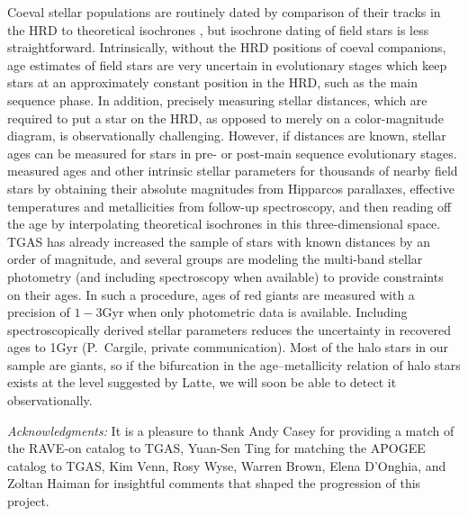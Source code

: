\documentclass[apj, twocolappendix, numberedappendix, appendixfloats]{emulateapj}
\begin{document}
Coeval stellar populations are routinely dated by comparison of their tracks in the HRD to theoretical isochrones \citep[e.g.,][]{sandage1970, chaboyer1998, dotter2007}, but isochrone dating of field stars is less straightforward.
Intrinsically, without the HRD positions of coeval companions, age estimates of field stars are very uncertain in evolutionary stages which keep stars at an approximately constant position in the HRD, such as the main sequence phase.
In addition, precisely measuring stellar distances, which are required to put a star on the HRD, as opposed to merely on a color-magnitude diagram, is observationally challenging.
However, if distances are known, stellar ages can be measured for stars in pre- or post-main sequence evolutionary stages.
\citet{gcs} measured ages and other intrinsic stellar parameters for thousands of nearby field stars by obtaining their absolute magnitudes from Hipparcos parallaxes, effective temperatures and metallicities from follow-up spectroscopy, and then reading off the age by interpolating theoretical isochrones in this three-dimensional space.
TGAS has already increased the sample of stars with known distances by an order of magnitude, and several groups are modeling the multi-band stellar photometry (and including spectroscopy when available) to provide constraints on their ages.
In such a procedure, ages of red giants are measured with a precision of $1-3$\;Gyr when only photometric data is available.
Including spectroscopically derived stellar parameters reduces the uncertainty in recovered ages to 1\;Gyr (P.~Cargile, private communication).
Most of the halo stars in our sample are giants, so if the bifurcation in the age--metallicity relation of halo stars exists at the level suggested by Latte, we will soon be able to detect it observationally.



\vspace{0.5cm}
\emph{Acknowledgments:}
It is a pleasure to thank Andy Casey for providing a match of the RAVE-on catalog to TGAS, Yuan-Sen Ting for matching the APOGEE catalog to TGAS, Kim Venn, Rosy Wyse, Warren Brown, Elena D'Onghia, and Zoltan Haiman for insightful comments that shaped the progression of this project.

\end{document}
